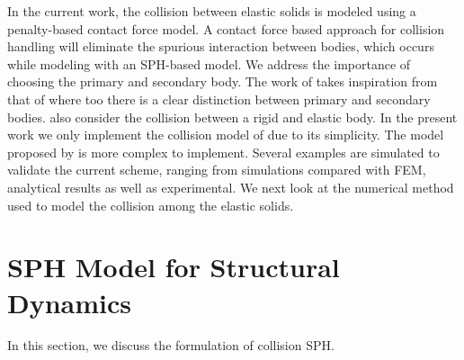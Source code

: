 


In the current work, the collision between elastic solids is modeled using a
penalty-based contact force model. A contact force based approach for collision
handling will eliminate the spurious interaction between bodies, which occurs
while modeling with an SPH-based model. We address the importance of choosing
the primary and secondary body. The work of \textcite{mohseni2021particle} takes
inspiration from that of \textcite{vyas2021collisional} where too there is a clear
distinction between primary and secondary bodies. \textcite{vyas2021collisional}
also consider the collision between a rigid and elastic body. In the present
work we only implement the collision model of \parencite{mohseni2021particle} due to
its simplicity. The model proposed by \textcite{vyas2021collisional} is more complex
to implement. Several examples are simulated to validate the current scheme,
ranging from simulations compared with FEM, analytical results as well as
experimental. We next look at the numerical method used to model the collision
among the elastic solids.


\FloatBarrier%
\section{SPH Model for Structural Dynamics}
\label{sec:SPH-model-for-structural-dynamics}
In this section, we discuss the formulation of collision SPH.

